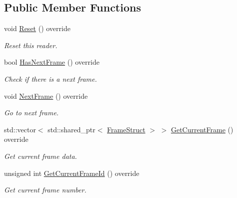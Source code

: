 \subsection*{Public Member Functions}
\begin{DoxyCompactItemize}
\item 
\mbox{\label{classmoetsi_1_1ssp_1_1iPhoneReader_a3d78eacce7d71483da93efde29f47241}} 
void \hyperlink{classmoetsi_1_1ssp_1_1iPhoneReader_a3d78eacce7d71483da93efde29f47241}{Reset} () override
\begin{DoxyCompactList}\small\item\em Reset this reader. \end{DoxyCompactList}\item 
bool \hyperlink{classmoetsi_1_1ssp_1_1iPhoneReader_a35ca55a03a9fb7b559f9381b11f53bfe}{Has\+Next\+Frame} () override
\begin{DoxyCompactList}\small\item\em Check if there is a next frame. \end{DoxyCompactList}\item 
\mbox{\label{classmoetsi_1_1ssp_1_1iPhoneReader_abba4479843de3e7ab42a3116b9fa94c9}} 
void \hyperlink{classmoetsi_1_1ssp_1_1iPhoneReader_abba4479843de3e7ab42a3116b9fa94c9}{Next\+Frame} () override
\begin{DoxyCompactList}\small\item\em Go to next frame. \end{DoxyCompactList}\item 
\mbox{\label{classmoetsi_1_1ssp_1_1iPhoneReader_ad3b35cece8ba5b53edb110b5c1aa80bc}} 
std\+::vector$<$ std\+::shared\+\_\+ptr$<$ \hyperlink{structmoetsi_1_1ssp_1_1FrameStruct}{Frame\+Struct} $>$ $>$ \hyperlink{classmoetsi_1_1ssp_1_1iPhoneReader_ad3b35cece8ba5b53edb110b5c1aa80bc}{Get\+Current\+Frame} () override
\begin{DoxyCompactList}\small\item\em Get current frame data. \end{DoxyCompactList}\item 
unsigned int \hyperlink{classmoetsi_1_1ssp_1_1iPhoneReader_a78792c6319743aed3ef2afc96fe16485}{Get\+Current\+Frame\+Id} () override
\begin{DoxyCompactList}\small\item\em Get current frame number. \end{DoxyCompactList}\item 

\end{DoxyCompactItemize}
